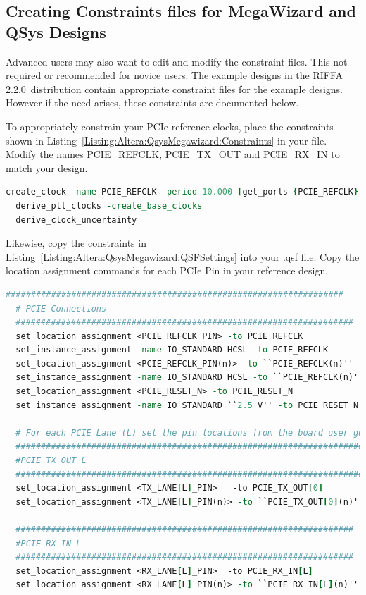 \documentclass{refrep}
\newcommand{\RIFFAVer}{2.2.0}
\newcommand{\Altera}[1]{{\color{blue}{#1}}}
\begin{document}
\pagebreak
\subsection{Creating Constraints files for MegaWizard and QSys Designs}
\label{Sec:Altera:QsysMegawizard:Constraints}
Advanced users may also want to edit and modify the constraint files. This not
required or recommended for novice users. The example designs in the RIFFA
\RIFFAVer~distribution contain appropriate constraint files for the example
designs. However if the need arises, these constraints are documented below.

To appropriately constrain your PCIe reference clocks, place the constraints
shown in Listing~\ref{Listing:Altera:QsysMegawizard:Constraints} in your
\Altera{.sdc} file. Modify the names PCIE\_REFCLK, PCIE\_TX\_OUT and
PCIE\_RX\_IN to match your design.
\begin{lstlisting}[basicstyle=\footnotesize\ttfamily,language=tcl,
    commentstyle=\color{red},label=Listing:Altera:QsysMegawizard:Constraints,
    caption=\Altera{.sdc} constraints for Qsys and Megawizard designs,frame=single]
  create_clock -name PCIE_REFCLK -period 10.000 [get_ports {PCIE_REFCLK}]
  derive_pll_clocks -create_base_clocks
  derive_clock_uncertainty
\end{lstlisting}
Likewise, copy the constraints in
Listing~\ref{Listing:Altera:QsysMegawizard:QSFSettings} into your .qsf file. Copy
the location assignment commands for each PCIe Pin in your reference design.

\begin{lstlisting}[language=tcl,basicstyle=\footnotesize\ttfamily,commentstyle=\color{red},
    label=Listing:Altera:QsysMegawizard:QSFSettings,
    caption=\Altera{.qsf} settings for Qsys and Megawizard designs,frame=single]
  ###################################################################
  # PCIE Connections
  ###################################################################
  set_location_assignment <PCIE_REFCLK_PIN> -to PCIE_REFCLK
  set_instance_assignment -name IO_STANDARD HCSL -to PCIE_REFCLK
  set_location_assignment <PCIE_REFCLK_PIN(n)> -to ``PCIE_REFCLK(n)''
  set_instance_assignment -name IO_STANDARD HCSL -to ``PCIE_REFCLK(n)''
  set_location_assignment <PCIE_RESET_N> -to PCIE_RESET_N
  set_instance_assignment -name IO_STANDARD ``2.5 V'' -to PCIE_RESET_N

  # For each PCIE Lane (L) set the pin locations from the board user guide!
  ######################################################################
  #PCIE TX_OUT L
  ######################################################################
  set_location_assignment <TX_LANE[L]_PIN>   -to PCIE_TX_OUT[0]
  set_location_assignment <TX_LANE[L]_PIN(n)> -to ``PCIE_TX_OUT[0](n)''

  ###################################################################
  #PCIE RX_IN L
  ###################################################################
  set_location_assignment <RX_LANE[L]_PIN>  -to PCIE_RX_IN[L]
  set_location_assignment <RX_LANE[L]_PIN(n)> -to ``PCIE_RX_IN[L](n)''
\end{lstlisting}
\pagebreak
\end{document}
